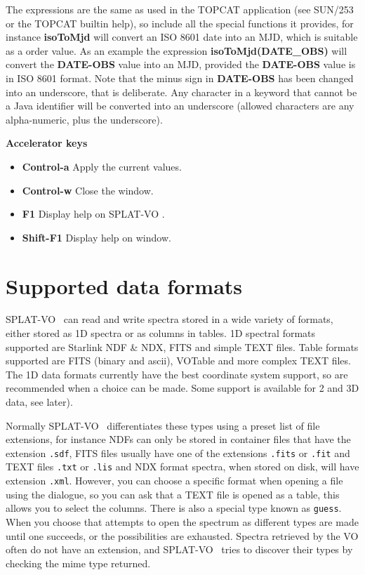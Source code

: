 \documentclass[twoside,11pt,nolof]{starlink}
\providecommand{\SPLAT}{\textsf{SPLAT-VO }}
\newcommand{\submenuitem}[2]{\latexhtml{\textbf{#1$\rightarrow$#2}}{\textbf{#1->#2}}}
\newcommand{\labelitem}[1]{\textbf{#1}}
\providecommand{\hitext}[1]{\texttt{#1}}
\providecommand{\subheading}[1]{\textbf{\large{#1}}}
\begin{document}
The expressions are the same as used in the TOPCAT application (see SUN/253 or
the TOPCAT builtin help), so include all the special functions it provides,
for instance \labelitem{isoToMjd} will convert an ISO 8601 date into an MJD,
which is suitable as a order value. As an example the expression
\labelitem{isoToMjd(DATE\_OBS)} will convert the
\labelitem{DATE-OBS} value into an MJD, provided the \labelitem{DATE-OBS}
value is in ISO 8601 format. Note that the minus sign in \labelitem{DATE-OBS}
has been changed into an underscore, that is deliberate. Any character in a
keyword that cannot be a Java identifier will be converted into an underscore
(allowed characters are any alpha-numeric, plus the underscore).

\subheading{Accelerator keys}

\begin{itemize}
\item \labelitem{Control-a} Apply the current values.

\item \labelitem{Control-w} Close the window.
\item \labelitem{F1} Display help on \SPLAT.
\item \labelitem{Shift-F1} Display help on window.
\end{itemize}


\newpage
\section{Supported data formats}

\SPLAT\ can read and write spectra stored in a wide variety of formats, either
stored as 1D spectra or as columns in tables. 1D spectral formats supported
are Starlink NDF \& NDX, FITS and simple TEXT files. Table formats supported
are FITS (binary and ascii), VOTable and more complex TEXT files. The 1D data
formats currently have the best coordinate system support, so are recommended
when a choice can be made. Some support is available for 2 and 3D data, see
later).

Normally \SPLAT\ differentiates these types using a preset list of file
extensions, for instance NDFs can only be stored in container files that have
the extension \hitext{.sdf}, FITS files usually have one of the extensions
\hitext{.fits} or \hitext{.fit} and TEXT files \hitext{.txt} or \hitext{.lis}
and NDX format spectra, when stored on disk, will have extension
\hitext{.xml}. However, you can choose a specific format when opening a file
using the \submenuitem{File}{Open} dialogue, so you can ask that a TEXT file
is opened as a table, this allows you to select the columns. There is also a
special type known as \hitext{guess}. When you choose that attempts to open
the spectrum as different types are made until one succeeds, or the
possibilities are exhausted. Spectra retrieved by the VO often do not have an extension, 
and \SPLAT\ tries to discover their types by checking the mime type returned.
\end{document}
